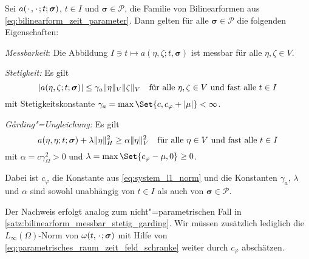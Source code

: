 \documentclass[../main.tex]{subfiles}
\begin{document}
\begin{Satz}
\label{satz:parametrische_bilinearform_messbar_stetig_garding}
    Sei $a({\mkern2mu\cdot\mkern2mu}, {\mkern2mu\cdot\mkern2mu}; t; \bm\sigma)$, $t \in I$ und $\bm\sigma \in \mathcal P$, die Familie von Bilinearformen aus \cref{eq:bilinearform_zeit_parameter}.
    Dann gelten für alle $\bm\sigma \in \mathcal P$ die folgenden Eigenschaften:
    \begin{thmenumerate}
        \item\label{satz:parametrische_bilinearform_messbar_stetig_garding:messbar}
        \emph{Messbarkeit}: Die Abbildung $I \ni t \mapsto a(\eta, \zeta; t, \bm\sigma)$ ist messbar für alle $\eta, \zeta \in V$.
        \item\label{satz:parametrische_bilinearform_messbar_stetig_garding:stetig}
        \emph{Stetigkeit:} Es gilt
        \begin{equation}
            \label{eq:parametrische_bilinearform_messbar_stetig_garding:stetig}
            \abs{a(\eta, \zeta; t; \bm\sigma)} \leq \gamma_{a} \norm{\eta}_{V} \norm{\zeta}_{V} \quad \fa \eta, \zeta \in V \text{ und fast alle } t \in I
        \end{equation}
        mit Stetigkeitskonstante $\gamma_{a} = \max\Set{c, c_{\varphi} + \abs{\mu}} < \infty$.
        \item\label{satz:parametrische_bilinearform_messbar_stetig_garding:garding}
        \emph{G\aa{}rding"=Ungleichung:} Es gilt
        \begin{equation}
            \label{eq:parametrische_bilinearform_messbar_stetig_garding:garding}
            a(\eta, \eta; t; \bm\sigma) + \lambda \norm{\eta}_{H}^{2} \geq \alpha \norm{\eta}_{V}^{2} \quad \fa \eta \in V \text{ und fast alle } t \in I
        \end{equation}
        mit $\alpha = c \gamma_{\Omega}^{2} > 0$ und $\lambda = \max\Set{c_{\varphi} - \mu, 0} \geq 0$.
    \end{thmenumerate}
    Dabei ist $c_{\varphi}$ die Konstante aus \cref{eq:system_l1_norm} und die Konstanten $\gamma_{a}$, $\lambda$ und $\alpha$ sind sowohl unabhängig von $t \in I$ als auch von $\bm\sigma \in \mathcal P$.

    \begin{Beweis}
        Der Nachweis erfolgt analog zum nicht"=parametrischen Fall in \cref{satz:bilinearform_messbar_stetig_garding}.
        Wir müssen zusätzlich lediglich die $L_{\infty}(\Omega)$-Norm von $\omega(t, {\mkern2mu\cdot\mkern2mu}; \bm\sigma)$ mit Hilfe von \cref{eq:parametrisches_raum_zeit_feld_schranke} weiter durch $c_{\varphi}$ abschätzen.
    \end{Beweis}
\end{Satz}
\end{document}
